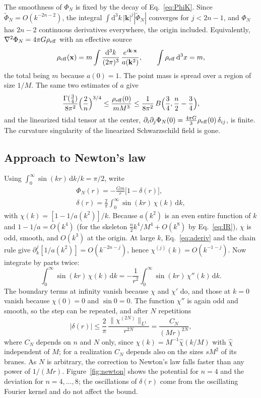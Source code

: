 \documentclass[aps,prd,10pt,twocolumn,superscriptaddress,nofootinbib,floatfix,longbibliography]{revtex4-2}
\newcommand{\dd}{\mathrm{d}}
\begin{document}
The smoothness of $\Phi_N$ is fixed by the decay of Eq.~\eqref{eq:PhiK}. Since $\tilde\Phi_N=O(k^{-2n-2})$, the integral $\int\dd^3k\,|\mathbf k|^j|\tilde\Phi_N|$ converges for $j<2n-1$, and $\Phi_N$ has $2n-2$ continuous derivatives everywhere, the origin included. Equivalently, $\nabla^2\Phi_N=4\pi G\rho_{\rm eff}$ with an effective source
\begin{equation}
\label{eq:rhoeff}
\rho_{\rm eff}(\mathbf x)=m\int\frac{\dd^3k}{(2\pi)^3}\,\frac{e^{i\mathbf k\cdot\mathbf x}}{a(\mathbf k^2)},\qquad\int\rho_{\rm eff}\,\dd^3x=m,
\end{equation}
the total being $m$ because $a(0)=1$. The point mass is spread over a region of size $1/M$. The same two estimates of $a$ give
\[
\frac{\Gamma(\frac34)}{8\pi^2}\Bigl(\frac2n\Bigr)^{3/4}\le\frac{\rho_{\rm eff}(0)}{mM^3}\le\frac{1}{8\pi^2}\,B\Bigl(\frac34,\frac n2-\frac34\Bigr),
\]
and the linearized tidal tensor at the center, $\partial_i\partial_j\Phi_N(0)=\frac{4\pi G}3\rho_{\rm eff}(0)\,\delta_{ij}$, is finite. The curvature singularity of the linearized Schwarzschild field is gone.

\subsection{Approach to Newton's law}

Using $\int_0^\infty\sin(kr)\,\dd k/k=\pi/2$, write
\begin{equation}
\label{eq:delta}
\begin{gathered}
\Phi_N(r)=-\frac{Gm}r\bigl[1-\delta(r)\bigr],\\
\delta(r)=\frac2\pi\int_0^\infty\sin(kr)\,\chi(k)\,\dd k ,
\end{gathered}
\end{equation}
with $\chi(k)=[1-1/a(k^2)]/k$. Because $a(k^2)$ is an even entire function of $k$ and $1-1/a=O(k^4)$ (for the skeleton $\frac n2k^4/M^4+O(k^8)$ by Eq.~\eqref{eq:IR}), $\chi$ is odd, smooth, and $O(k^3)$ at the origin. At large $k$, Eq.~\eqref{eq:aderiv} and the chain rule give $\partial_k^j[1/a(k^2)]=O(k^{-2n-j})$, hence $\chi^{(j)}(k)=O(k^{-1-j})$. Now integrate by parts twice:
\[
\int_0^\infty\sin(kr)\,\chi(k)\,\dd k=-\frac1{r^2}\int_0^\infty\sin(kr)\,\chi''(k)\,\dd k .
\]
The boundary terms at infinity vanish because $\chi$ and $\chi'$ do, and those at $k=0$ vanish because $\chi(0)=0$ and $\sin0=0$. The function $\chi''$ is again odd and smooth, so the step can be repeated, and after $N$ repetitions
\begin{equation}
\label{eq:tail}
|\delta(r)|\le\frac2\pi\,\frac{\|\chi^{(2N)}\|_{L^1}}{r^{2N}}=\frac{C_N}{(Mr)^{2N}},
\end{equation}
where $C_N$ depends on $n$ and $N$ only, since $\chi(k)=M^{-1}\hat\chi(k/M)$ with $\hat\chi$ independent of $M$; for a realization $C_N$ depends also on the sizes $sM^2$ of its branes. As $N$ is arbitrary, the correction to Newton's law falls faster than any power of $1/(Mr)$. Figure~\ref{fig:newton} shows the potential for $n=4$ and the deviation for $n=4,\dots,8$; the oscillations of $\delta(r)$ come from the oscillating Fourier kernel and do not affect the bound.
\end{document}
